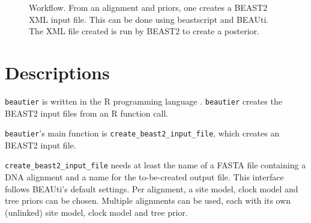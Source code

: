 \documentclass{article}
\begin{document}
\begin{figure}

  \caption{
    Workflow. From an alignment and priors, one creates a BEAST2 XML input file. This
    can be done using beastscript and BEAUti. The XML file created is run by BEAST2
    to create a posterior.
  }
  \label{fig:workflow}
\end{figure}

\section{Descriptions}

\verb;beautier; is written in the R programming language \cite{R}.
\verb;beautier; creates the BEAST2 input files from an R function call.

\verb;beautier;'s main function is \verb;create_beast2_input_file;, which creates
an BEAST2 input file. 

\verb;create_beast2_input_file; needs at least the name of a FASTA file containing a DNA alignment
and a name for the to-be-created output file. This interface follows BEAUti's default settings.
Per alignment, a site model, clock model and tree priors can be chosen.
Multiple alignments can be used, each with its own (unlinked) site model, clock model and tree prior.
\end{document}
